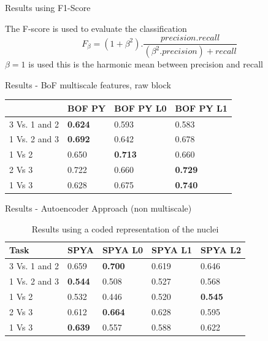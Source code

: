 \documentclass[usenames,dvipsnames]{beamer}
\begin{document}
\begin{frame}{Results using F1-Score}

The F-score is used to evaluate the classification
\begin{equation}
    F_{\beta} = (1+\beta^{2}).\frac{precision.recall}{(\beta^{2}.precision)+recall}
\end{equation}
$\beta=1$ is used this is the harmonic mean between precision and recall
\end{frame}




\begin{frame}{Results - BoF multiscale features, raw block}

\begin{table}
\begin{tabular}{|l|l|l|l|}
\hline
  & BOF PY & BOF PY L0 & BOF PY L1 \\ \hline
3 Vs. 1 and 2 & \textbf{0.624}   & 0.593 & 0.583 \\ \hline
1 Vs. 2 and 3 & \textbf{0.692} & 0.642  & 0.678 \\ \hline
1 Vs 2        & 0.650  & \textbf{0.713} & 0.660 \\ \hline
2 Vs 3        & 0.722 & 0.660  & \textbf{0.729} \\ \hline
1 Vs 3        & 0.628  & 0.675                           & \textbf{0.740} \\ \hline
\end{tabular}
\end{table}




\end{frame}

\begin{frame}{Results - Autoencoder Approach (non multiscale)}

\begin{table}[]
\begin{tabular}{|l|l|l|l|l|}
\hline
Task & SPYA   & SPYA L0 & SPYA L1 & SPYA L2                      \\ \hline
3 Vs. 1 and 2 & 0.659 &\textbf{ 0.700} & 0.619  & \multicolumn{1}{l|}{0.646}  \\ \hline
1 Vs. 2 and 3 & \textbf{0.544} & 0.508 & 0.527  & \multicolumn{1}{l|}{0.568} \\ \hline
1 Vs 2        & 0.532 & 0.446 & 0.520  & \multicolumn{1}{l|}{\textbf{0.545}} \\ \hline
2 Vs 3        & 0.612 & \textbf{0.664} &0.628  & \multicolumn{1}{l|}{ 0.595} \\ \hline
1 Vs 3        & \textbf{0.639} & 0.557 & 0.588  & \multicolumn{1}{l|}{0.622} \\ \hline
\end{tabular}
\caption{Results using a coded representation of the nuclei}
\end{table}

\end{frame}
\end{document}
